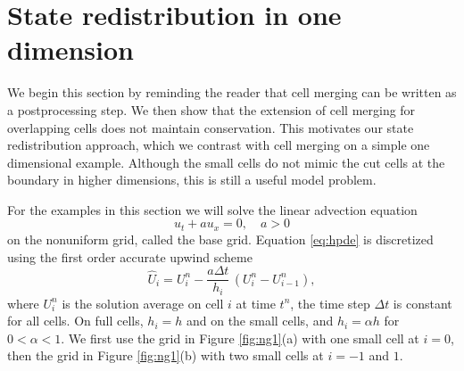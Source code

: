 \section{State redistribution in one dimension} \label{sec:srd1d}
We begin this section  by reminding the reader that cell merging can
be written as a postprocessing step. We then show that the extension of
cell merging for overlapping cells does not maintain conservation. 
This motivates our state redistribution approach, which we contrast with
cell merging on a simple one dimensional example. 
Although the small cells do not mimic the cut cells at the 
boundary in higher dimensions, this is still a useful model problem. 

For the examples in this section we will solve the linear advection equation
\begin{equation}\label{eq:hpde}
u_t + au_x = 0, \quad a>0
\end{equation}
on the nonuniform grid, called the base grid. Equation \eqref{eq:hpde} is
discretized  using the  first order
accurate upwind scheme 
\begin{equation}\label{eq:unstable1d}
\widehat{U}_i = U^n_i - \frac{a \Delta t} {h_i} \, (U^n_i -U^n_{i-1}),
\end{equation}
where $U^n_i$ is the solution average on cell $i$ at time $t^n$, the time
step $\Delta t$ is constant for all cells. On full cells, $h_i = h$ and on
the small cells,  and $h_i = \alpha h$ for $ 0 < \alpha < 1$.
We first use
the grid in Figure \ref{fig:ng1}(a) with one small cell at $i=0$, then the grid
in Figure \ref{fig:ng1}(b) with two small cells at $i = -1$ and $1$.

